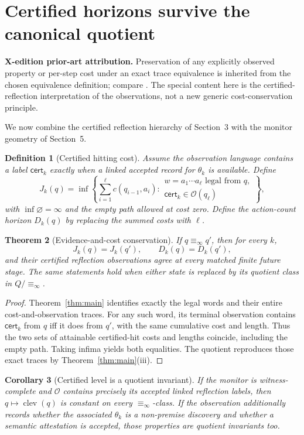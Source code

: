 \documentclass[11pt,letterpaper]{article}
\newcommand{\PriorArtNote}[1]{%
\par\smallskip\noindent\begin{minipage}{\linewidth}\small\color{black!85}%
\textbf{X-edition prior-art attribution.} #1\end{minipage}\par\smallskip}
\newtheorem{theorem}{Theorem}[section]
\newtheorem{corollary}[theorem]{Corollary}
\newtheorem{definition}[theorem]{Definition}
\newcommand{\Cert}{\mathsf{cert}}
\newcommand{\clev}{\operatorname{clev}}
\newcommand{\Ob}{\mathcal{O}}
\newcommand{\Rinf}{\equiv_{\!\infty}}
\begin{document}
\section{Certified horizons survive the canonical quotient}
\PriorArtNote{Preservation of any explicitly observed property or per-step cost under an exact trace equivalence is inherited from the chosen equivalence definition; compare \cite{nerode,milner}. The special content here is the certified-reflection interpretation of the observations, not a new generic cost-conservation principle.}
We now combine the certified reflection hierarchy of Section~3 with the monitor geometry of Section~5.
\begin{definition}[Certified hitting cost]\label{def:hitting}
Assume the observation language contains a label $\Cert_k$ exactly when a linked accepted record for $\theta_k$ is available. Define
\[
 J_k(q)=\inf\left\{\sum_{i=1}^{\ell}c(q_{i-1},a_i):
 \begin{array}{l}w=a_1\cdots a_\ell\text{ legal from }q,\\ \Cert_k\in\Ob(q_\ell)\end{array}\right\},
\]
with $\inf\varnothing=\infty$ and the empty path allowed at cost zero. Define the action-count horizon $D_k(q)$ by replacing the summed costs with $\ell$.
\end{definition}
\begin{theorem}[Evidence-and-cost conservation]\label{thm:hitting}
If $q\Rinf q'$, then for every $k$,
\[
 J_k(q)=J_k(q'),\qquad D_k(q)=D_k(q'),
\]
and their certified reflection observations agree at every matched finite future stage. The same statements hold when either state is replaced by its quotient class in $Q/\Rinf$.
\end{theorem}
\begin{proof}
Theorem~\ref{thm:main} identifies exactly the legal words and their entire cost-and-observation traces. For any such word, its terminal observation contains $\Cert_k$ from $q$ iff it does from $q'$, with the same cumulative cost and length. Thus the two sets of attainable certified-hit costs and lengths coincide, including the empty path. Taking infima yields both equalities. The quotient reproduces those exact traces by Theorem~\ref{thm:main}(iii).
\end{proof}
\begin{corollary}[Certified level is a quotient invariant]\label{cor:level}
If the monitor is witness-complete and $\Ob$ contains precisely its accepted linked reflection labels, then $q\mapsto\clev(q)$ is constant on every $\Rinf$-class. If the observation additionally records whether the associated $\theta_k$ is a non-premise discovery and whether a semantic attestation is accepted, those properties are quotient invariants too.
\end{corollary}
\end{document}
